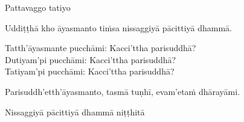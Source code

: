 \begin{center}
  Pattavaggo tatiyo
\end{center}

\medskip

\begin{center}
Uddiṭṭhā kho āyasmanto tiṁsa nissaggiyā pācittiyā dhammā.

\smallskip

Tatth'āyasmante pucchāmi: Kacci'ttha parisuddhā?\\
Dutiyam'pi pucchāmi: Kacci'ttha parisuddhā?\\
Tatiyam'pi pucchāmi: Kacci'ttha parisuddhā?

\smallskip

Parisuddh'etth'āyasmanto, tasmā tuṇhī, evam'etaṁ dhārayāmi.
\end{center}

\begin{outro}
  Nissaggiyā pācittiyā dhammā niṭṭhitā
\end{outro}

\clearpage
